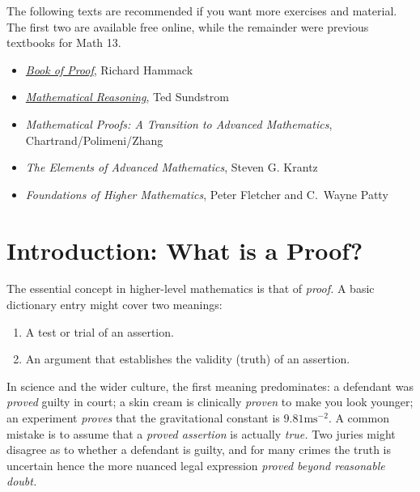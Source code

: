
The following texts are recommended if you want more exercises and material. The first two are available free online, while the remainder were previous textbooks for Math 13.

\begin{itemize}%
	\item \href{http://www.people.vcu.edu/~rhammack/BookOfProof/}{\emph{Book of Proof}}, Richard Hammack%
	
	\item \href{http://scholarworks.gvsu.edu/books/9/}{\emph{Mathematical Reasoning}}, Ted Sundstrom%

	\item \emph{Mathematical Proofs: A Transition to Advanced Mathematics}, Chartrand/Polimeni/Zhang%
	\item \emph{The Elements of Advanced Mathematics}, Steven G. Krantz%
	\item \emph{Foundations of Higher Mathematics}, Peter Fletcher and C.~Wayne Patty%
\end{itemize}




\clearpage

\section{Introduction: What is a Proof?}\label{chap:intro}


The essential concept in higher-level mathematics is that of \emph{proof.} A basic dictionary entry might cover two meanings:
\begin{enumerate}%
	\item A test or trial of an assertion.
	\item An argument that establishes the validity (truth) of an assertion.
\end{enumerate}
In science and the wider culture, the first meaning predominates: a defendant was \emph{proved} guilty in court; a skin cream is clinically \emph{proven} to make you look younger; an experiment \emph{proves} that the gravitational constant is $9.81\mathrm{ms}^{-2}$. A common mistake is to assume that a \emph{proved assertion} is actually \emph{true.} Two juries might disagree as to whether a defendant is guilty, and for many crimes the truth is uncertain hence the more nuanced legal expression \emph{proved beyond reasonable doubt.}\smallbreak

